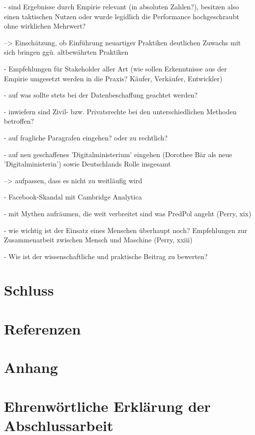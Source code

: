 \documentclass[a4paper,12pt,parskip,bibtotoc,liststotoc]{article}
\begin{document}
- sind Ergebnisse durch Empirie relevant (in absoluten Zahlen?), besitzen also einen taktischen Nutzen oder wurde legidlich die Performance hochgeschraubt ohne wirklichen Mehrwert?

--> Einschätzung, ob Einführung neuartiger Praktiken deutlichen Zuwachs mit sich bringen ggü. altbewährten Praktiken

- Empfehlungen für Stakeholder aller Art (wie sollen Erkenntnisse aus der Empirie umgesetzt werden in die Praxis? Käufer, Verkäufer, Entwickler)

- auf was sollte stets bei der Datenbeschaffung geachtet werden?

- inwiefern sind Zivil- bzw. Privatsrechte bei den unterschiedlichen Methoden betroffen? 

- auf fragliche Paragrafen eingehen? oder zu rechtlich? 

- auf neu geschaffenes 'Digitalministerium' eingehen (Dorothee Bär als neue 'Digitalministerin') sowie Deutschlands Rolle insgesamt 

--> aufpassen, dass es nicht zu weitläufig wird

- Facebook-Skandal mit Cambridge Analytica

- mit Mythen aufräumen, die weit verbreitet sind was PredPol angeht (Perry, xix)

- wie wichtig ist der Einsatz eines Menschen überhaupt noch? Empfehlungen zur Zusammenarbeit zwischen Mensch und Maschine (Perry, xxiii) 

- Wie ist der wissenschaftliche und praktische Beitrag zu bewerten?


\newpage
\section{Schluss}

\section{Referenzen}

\section{Anhang}

\section{Ehrenwörtliche Erklärung der Abschlussarbeit}
\end{document}
